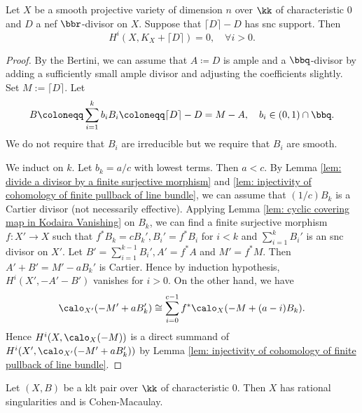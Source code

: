     \begin{theorem}\label{thm: Kawamata-Viehweg Vanishing Theorem in KM98}
        Let \(X\) be a smooth projective variety of dimension \(n\) over \(\kk\) of characteristic \(0\) and \(D\) a nef \(\bbr\)-divisor on \(X\).
        Suppose that \(\lceil D \rceil - D\) has snc support.
        Then
        \[
            H^i(X, K_X + \lceil D \rceil) = 0,\quad \forall i > 0.
        \]
    \end{theorem}
    \begin{proof}
        By the Bertini, we can assume that \(A \coloneqq D\) is ample and a \(\bbq\)-divisor by adding a sufficiently small ample divisor and adjusting the coefficients slightly.
        Set \(M:= \lceil D \rceil\).
        Let 
        \[ B \coloneqq \sum_{i=1}^k b_i B_i \coloneqq \lceil D \rceil - D = M - A, \quad b_i \in (0,1) \cap \bbq. \]
        We do not require that \(B_i\) are irreducible but we require that \(B_i\) are smooth.

        We induct on \(k\).
        Let \(b_k = a/c\) with lowest terms.
        Then \(a<c\).
        By Lemma \ref{lem: divide a divisor by a finite surjective morphism} and \ref{lem: injectivity of cohomology of finite pullback of line bundle}, we can assume that \((1/c)B_k\) is a Cartier divisor (not necessarily effective).
        Applying Lemma \ref{lem: cyclic covering map in Kodaira Vanishing} on \(B_k\),
        we can find a finite surjective morphism \(f: X' \to X\) such that \(f^*B_k = cB_k', B_i' = f^*B_i\) for \(i < k\) and \(\sum_{i=1}^{k} B_i'\) is an snc divisor on \(X'\).
        Let \(B' = \sum_{i=1}^{k-1}B_i', A' = f^*A\) and \(M' = f^*M\).
        Then \(A'+ B' =  M'-aB_k'\) is Cartier.
        Hence by induction hypothesis, \( H^i(X', -A' - B')\) vanishes for \(i > 0\).
        On the other hand, we have
        \[ \calo_{X'}(-M' + aB_k') \cong \sum_{i=0}^{c-1} f^*\calo_X(-M + (a-i) B_k). \]
        Hence \(H^i(X,\calo_X(-M))\) is a direct summand of \(H^i(X', \calo_{X'}(-M' + aB_k'))\) by Lemma \ref{lem: injectivity of cohomology of finite pullback of line bundle}.
    \end{proof}

    \begin{lemma}\label{lem: klt pair has rational singularities and is Cohen-Macaulay}
        Let \((X,B)\) be a klt pair over \(\kk\) of characteristic \(0\).
        Then \(X\) has rational singularities and is Cohen-Macaulay.
    \end{lemma}

